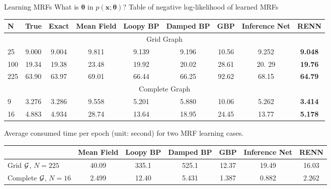\begin{frame}[label=current]
  {Learning MRFs}
  {What is $\bm{\theta}$ in $p(\bm{x};\bm{\theta})$?}
  \vskip 0.5cm
  Table of negative log-likelihood of learned MRFs \\
  \begin{table}
    \begin{adjustbox}{width=0.9\textwidth}
      \begin{tabular}{lcccccccc}
        \toprule
        N & True & Exact & Mean Field & Loopy BP & Damped BP & GBP & Inference Net & RENN \\
        \toprule
        \multicolumn{9}{c}{Grid Graph}\\
        \midrule
        25  &  9.000  &  9.004  &  9.811  &  {9.139}  &  9.196  &  10.56  &  9.252  &  \textbf{9.048}  \\
        100 &  19.34  &  19.38  &  23.48  &  {19.92}  &  20.02  &  28.61  &  20. 29  &  \textbf{19.76} \\
        225 &  63.90  &  63.97  &  69.01  &  66.44    &  66.25  &  92.62  &  68.15  &  \textbf{64.79}  \\
        \toprule
        \multicolumn{9}{c}{Complete Graph}\\
        \midrule
        9  &  3.276  &  3.286  &  9.558  &  5.201  &  5.880  &  10.06  &  5.262  & \textbf{3.414}  \\
        16  &  4.883  &  4.934  &  28.74  &  13.64  &  18.95  &  24.45  &  13.77  &  \textbf{5.178}  \\

        \bottomrule
      \end{tabular}
    \end{adjustbox}
  \end{table}
  \vskip 0.5cm
  {Average consumed time per epoch (unit: second) for two MRF learning cases.}
  \begin{table}
    \centering
    \begin{adjustbox}{width=0.9\textwidth}
      \begin{tabular}{lcccccc}
        \toprule
        {} &  Mean Field & Loopy BP & Damped BP & GBP & Inference Net & RENN \\
        \toprule
        Grid $\mathcal{G}$,\! $N\!=\!225\!\!$ & 40.09 & 335.1 & 525.1 & 12.37 & 19.49 & 16.03 \\
        Complete\! $\mathcal{G}$,\! $N=\!16\!\!$ & 2.499 & 12.40 & 5.431 & 1.387 & 0.882 & 2.262 \\
        \bottomrule
      \end{tabular}
    \end{adjustbox}
  \end{table}

\end{frame}

